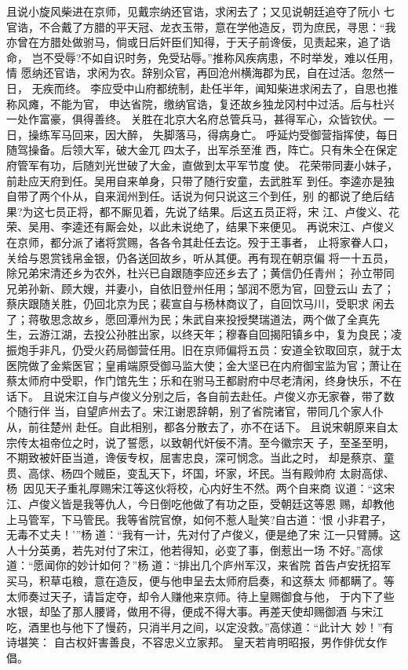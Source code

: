 且说小旋风柴进在京师，见戴宗纳还官诰，求闲去了；又见说朝廷追夺了阮小
七官诰，不合戴了方腊的平天冠、龙衣玉带，意在学他造反，罚为庶民，寻思：“我
亦曾在方腊处做驸马，倘或日后奸臣们知得，于天子前谗佞，见责起来，追了诰命，
岂不受辱?不如自识时务，免受玷辱。”推称风疾病患，不时举发，难以任用，情
愿纳还官诰，求闲为农。辞别众官，再回沧州横海郡为民，自在过活。忽然一日，
无疾而终。
李应受中山府都统制，赴任半年，闻知柴进求闲去了，自思也推称风瘫，不能为官，
申达省院，缴纳官诰，复还故乡独龙冈村中过活。后与杜兴一处作富豪，俱得善终。
关胜在北京大名府总管兵马，甚得军心，众皆钦伏。一日，操练军马回来，因大醉，
失脚落马，得病身亡。
呼延灼受御营指挥使，每日随驾操备。后领大军，破大金兀四太子，出军杀至淮
西，阵亡。只有朱仝在保定府管军有功，后随刘光世破了大金，直做到太平军节度
使。
花荣带同妻小妹子，前赴应天府到任。吴用自来单身，只带了随行安童，去武胜军
到任。李逵亦是独自带了两个仆从，自来润州到任。话说为何只说这三个到任，别
的都说了绝后结果?为这七员正将，都不厮见着，先说了结果。后这五员正将，宋
江、卢俊义、花荣、吴用、李逵还有厮会处，以此未说绝了，结果下来便见。
再说宋江、卢俊义在京师，都分派了诸将赏赐，各各令其赴任去讫。殁于王事者，
止将家眷人口，关给与恩赏钱帛金银，仍各送回故乡，听从其便。再有现在朝京偏
将一十五员，除兄弟宋清还乡为农外，杜兴已自跟随李应还乡去了；黄信仍任青州；
孙立带同兄弟孙新、顾大嫂，并妻小，自依旧登州任用；邹润不愿为官，回登云山
去了；蔡庆跟随关胜，仍回北京为民；裴宣自与杨林商议了，自回饮马川，受职求
闲去了；蒋敬思念故乡，愿回潭州为民；朱武自来投授樊瑞道法，两个做了全真先
生，云游江湖，去投公孙胜出家，以终天年；穆春自回揭阳镇乡中，复为良民；凌
振炮手非凡，仍受火药局御营任用。旧在京师偏将五员：安道全钦取回京，就于太
医院做了金紫医官；皇甫端原受御马监大使；金大坚已在内府御宝监为官；萧让在
蔡太师府中受职，作门馆先生；乐和在驸马王都尉府中尽老清闲，终身快乐，不在
话下。
且说宋江自与卢俊义分别之后，各自前去赴任。卢俊义亦无家眷，带了数个随行伴
当，自望庐州去了。宋江谢恩辞朝，别了省院诸官，带同几个家人仆从，前往楚州
赴任。自此相别，都各分散去了，亦不在话下。
且说宋朝原来自太宗传太祖帝位之时，说了誓愿，以致朝代奸佞不清。至今徽宗天
子，至圣至明，不期致被奸臣当道，谗佞专权，屈害忠良，深可悯念。当此之时，
却是蔡京、童贯、高俅、杨四个贼臣，变乱天下，坏国，坏家，坏民。当有殿帅府
太尉高俅、杨，因见天子重礼厚赐宋江等这伙将校，心内好生不然。两个自来商
议道：“这宋江、卢俊义皆是我等仇人，今日倒吃他做了有功之臣，受朝廷这等恩
赐，却教他上马管军，下马管民。我等省院官僚，如何不惹人耻笑?自古道：‘恨
小非君子，无毒不丈夫！’”杨道：“我有一计，先对付了卢俊义，便是绝了宋
江一只臂膊。这人十分英勇，若先对付了宋江，他若得知，必变了事，倒惹出一场
不好。”高俅道：“愿闻你的妙计如何？”杨道：“排出几个庐州军汉，来省院
首告卢安抚招军买马，积草屯粮，意在造反，便与他申呈去太师府启奏，和这蔡太
师都瞒了。等太师奏过天子，请旨定夺，却令人赚他来京师。待上皇赐御食与他，
于内下了些水银，却坠了那人腰肾，做用不得，便成不得大事。再差天使却赐御酒
与宋江吃，酒里也与他下了慢药，只消半月之间，以定没救。”高俅道：“此计大
妙！”有诗堪笑：
自古权奸害善良，不容忠义立家邦。
皇天若肯明昭报，男作俳优女作倡。

